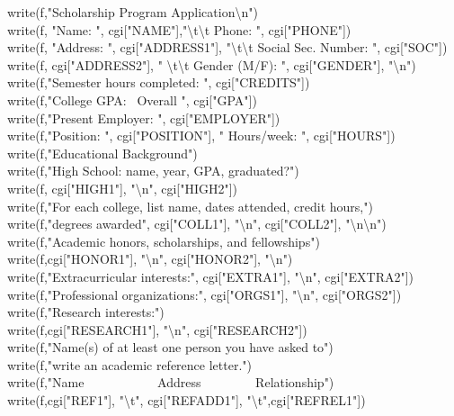 {\>write(f,"Scholarship Program Application{\textbackslash}n") \\
\>write(f, "Name: ", cgi["NAME"],"{\textbackslash}t{\textbackslash}t Phone: ", cgi["PHONE"]) \\
\>write(f, "Address: ", cgi["ADDRESS1"], "{\textbackslash}t{\textbackslash}t Social Sec. Number: ", cgi["SOC"]) \\
\>write(f, cgi["ADDRESS2"], " {\textbackslash}t{\textbackslash}t Gender (M/F): ",
cgi["GENDER"], "{\textbackslash}n") \\
\>write(f,"Semester hours completed: ", cgi["CREDITS"]) \\
\>write(f,"College GPA: \ Overall ", cgi["GPA"]) \\
\>write(f,"Present Employer: ", cgi["EMPLOYER"]) \\
\>write(f,"Position: ", cgi["POSITION"], " Hours/week: ", cgi["HOURS"]) \\
\>write(f,"Educational Background") \\
\>write(f,"High School: name, year, GPA, graduated?") \\
\>write(f, cgi["HIGH1"], "{\textbackslash}n", cgi["HIGH2"]) \\
\>write(f,"For each college, list name, dates attended, credit hours,") \\
\>write(f,"degrees awarded", cgi["COLL1"], "{\textbackslash}n", cgi["COLL2"],
"{\textbackslash}n{\textbackslash}n") \\
\>write(f,"Academic honors, scholarships, and fellowships") \\
\>write(f,cgi["HONOR1"], "{\textbackslash}n", cgi["HONOR2"], "{\textbackslash}n") \\
\> write(f,"Extracurricular interests:", cgi["EXTRA1"], "{\textbackslash}n", cgi["EXTRA2"]) \\
\>write(f,"Professional organizations:", cgi["ORGS1"], "{\textbackslash}n", cgi["ORGS2"]) \\
\>write(f,"Research interests:") \\
\>write(f,cgi["RESEARCH1"], "{\textbackslash}n", cgi["RESEARCH2"]) \\
\>write(f,"Name(s) of at least one person you have asked to") \\
\>write(f,"write an academic reference letter.") \\
\>write(f,"Name \ \ \ \ \ \ \ \ \ \ \ Address \ \ \ \ \ \ \ \ Relationship") \\
\>write(f,cgi["REF1"], "{\textbackslash}t", cgi["REFADD1"], "{\textbackslash}t",cgi["REFREL1"]) \\
}

